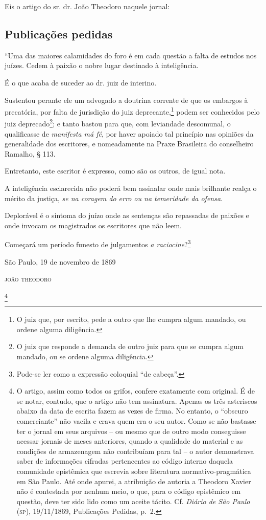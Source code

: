 Eis o artigo do sr. dr. João Theodoro naquele jornal:

\subsection{Publicações pedidas}

``Uma das maiores calamidades do foro é em cada questão a falta de
estudos nos juízes. Cedem à paixão o nobre lugar destinado à
inteligência.

É o que acaba de suceder ao dr. juiz de interino.

Sustentou perante ele um advogado a doutrina corrente de que os embargos
à precatória, por falta de jurisdição do juiz deprecante,\footnote{ O
  juiz que, por escrito, pede a outro que lhe cumpra algum mandado, ou
  ordene alguma diligência.} podem ser conhecidos pelo juiz
deprecado\footnote{ O juiz que responde a demanda de outro juiz para
  que se cumpra algum mandado, ou se ordene alguma diligência.}; e tanto
bastou para que, com leviandade descomunal, o qualificasse de
\emph{manifesta má fé}, por haver apoiado tal princípio nas opiniões da
generalidade dos escritores, e nomeadamente na Praxe Brasileira do
conselheiro Ramalho, § 113.

Entretanto, este escritor é expresso, como são os outros, de igual nota.

A inteligência esclarecida não poderá bem assinalar onde mais brilhante
realça o mérito da justiça, \emph{se na coragem do erro ou na temeridade
da ofensa}.

Deplorável é o sintoma do juízo onde as sentenças são repassadas de
paixões e onde invocam os magistrados os escritores que não leem.

Começará um período funesto de julgamentos \emph{a
raciocine}?\footnote{ Pode-se ler como a expressão coloquial ``de
  cabeça''.}

\begin{flushright}
São Paulo, 19 de novembro de 1869

\textsc{joão theodoro}
\end{flushright}

\asterisc{}\footnote{ O artigo, assim como todos os grifos, confere exatamente
  com original. É de se notar, contudo, que o artigo não tem assinatura.
  Apenas os três asteriscos abaixo da data de escrita fazem as vezes de
  firma. No entanto, o ``obscuro comerciante'' não vacila e crava quem era
  o seu autor. Como se não bastasse ter o jornal em seus arquivos -- ou
  mesmo que de outro modo conseguisse acessar jornais de meses
  anteriores, quando a qualidade do material e as condições de
  armazenagem não contribuíam para tal -- o autor demonstrava saber de
  informações cifradas pertencentes ao código interno daquela comunidade
  epistêmica que escrevia sobre literatura normativo-pragmática em São
  Paulo. Até onde apurei, a atribuição de autoria a Theodoro Xavier não
  é contestada por nenhum meio, o que, para o código epistêmico em
  questão, deve ter sido lido como um aceite tácito. Cf. \emph{Diário de
  São Paulo} (\textsc{sp}), 19/11/1869, Publicações Pedidas, p.~2.}


